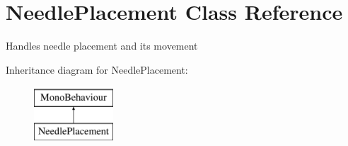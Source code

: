 \hypertarget{class_needle_placement}{}\section{Needle\+Placement Class Reference}
\label{class_needle_placement}


Handles needle placement and its movement  


Inheritance diagram for Needle\+Placement\+:\begin{figure}[H]
\begin{center}
\leavevmode
\includegraphics[height=2.000000cm]{class_needle_placement}
\end{center}
\end{figure}
